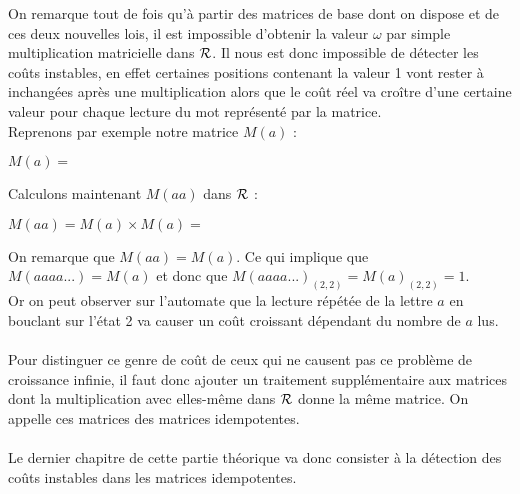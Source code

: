 \documentclass{report}
\begin{document}
On remarque tout de fois qu'à partir des matrices de base dont on dispose et de ces deux nouvelles lois, il est impossible d'obtenir la valeur $\omega$ par simple multiplication matricielle dans $\mathcal{R}$. Il nous est donc impossible de détecter les coûts instables, en effet certaines positions contenant la valeur 1 vont rester à inchangées après une multiplication alors que le coût réel va croître d'une certaine valeur pour chaque lecture du mot représenté par la matrice.\\

Reprenons par exemple notre matrice $M(a)$ : \\
\begin{center}
$M(a)=$
\end{center}

Calculons maintenant $M(aa)$ dans $\mathcal{R}$ :

\begin{center}
$M(aa) = M(a) \times M(a) =$
\end{center}

On remarque que $M(aa) = M(a)$. Ce qui implique que $M(aaaa...) = M(a)$ et donc que $M(aaaa...)_{(2,2)} = M(a)_{(2,2)}=1$. \\
Or on peut observer sur l'automate que la lecture répétée de la lettre $a$ en bouclant sur l'état 2 va causer un coût croissant dépendant du nombre de $a$ lus. \\\\
Pour distinguer ce genre de coût de ceux qui ne causent pas ce problème de croissance infinie, il faut donc ajouter un traitement supplémentaire aux matrices dont la multiplication avec elles-même dans $\mathcal{R}$	 donne la même matrice. On appelle ces matrices des matrices idempotentes.\\\\
Le dernier chapitre de cette partie théorique va donc consister à la détection des coûts instables dans les matrices idempotentes.
\end{document}
